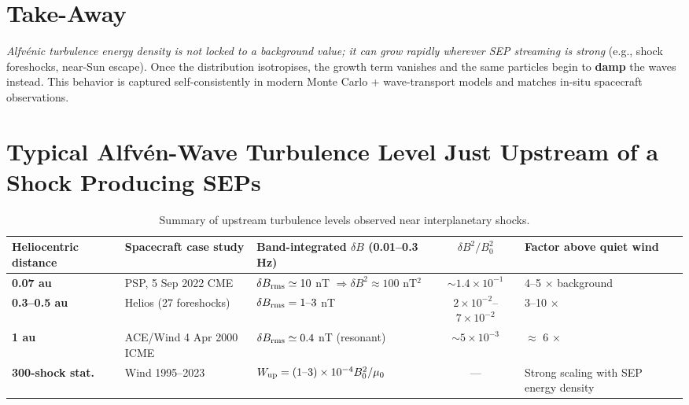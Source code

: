 \section*{Take-Away}

\textit{Alfvénic turbulence energy density is not locked to a background value; it can grow rapidly wherever SEP streaming is strong} (e.g., shock foreshocks, near-Sun escape).  
Once the distribution isotropises, the growth term vanishes and the same particles begin to \textbf{damp} the waves instead.  
This behavior is captured self-consistently in modern Monte Carlo + wave-transport models and matches in-situ spacecraft observations.


\section*{Typical Alfvén-Wave Turbulence Level Just Upstream of a Shock Producing SEPs}

\begin{table}[h!]
\centering
\begin{tabular}{|l|l|l|c|l|}
\hline
\textbf{Heliocentric distance} & \textbf{Spacecraft case study} & \textbf{Band-integrated $\delta B$ (0.01–0.3 Hz)} & $\delta B^2/B_0^2$ & \textbf{Factor above quiet wind} \\
\hline
\textbf{0.07 au} & PSP, 5 Sep 2022 CME & $\delta B_{\rm rms} \simeq 10$ nT $\Rightarrow \delta B^2 \approx 100$ nT$^2$ & $\sim 1.4\times10^{-1}$ & 4–5 × background \cite{psp2022} \\
\textbf{0.3–0.5 au} & Helios (27 foreshocks) & $\delta B_{\rm rms} = 1\text{–}3$ nT & $2\times10^{-2}$–$7\times10^{-2}$ & 3–10 × \cite{helios2004} \\
\textbf{1 au} & ACE/Wind 4 Apr 2000 ICME & $\delta B_{\rm rms} \simeq 0.4$ nT (resonant) & $\sim 5\times10^{-3}$ & $\approx$ 6 × \cite{swsc2015} \\
\textbf{300-shock stat.} & Wind 1995–2023 & $W_{\rm up} = (1\text{–}3)\times10^{-4} B_0^2/\mu_0$ & — & Strong scaling with SEP energy density \cite{frontiers2020} \\
\hline
\end{tabular}
\caption{Summary of upstream turbulence levels observed near interplanetary shocks.}
\end{table}

